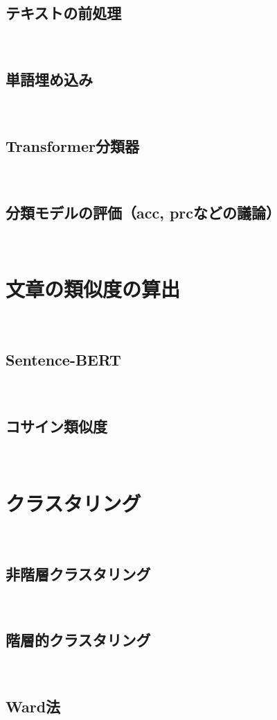 \documentclass[12pt,a4j]{jreport}
\begin{document}
\subsection{テキストの前処理}
~

\subsection{単語埋め込み}
~

\subsection{Transformer分類器}
~

\subsection{分類モデルの評価（acc, prcなどの議論）}
~

\section{文章の類似度の算出}
~

\subsection{Sentence-BERT}
~

\subsection{コサイン類似度}
~

\section{クラスタリング}
~

\subsection{非階層クラスタリング}
~

\subsection{階層的クラスタリング}
~

\subsection{Ward法}
~
\end{document}
